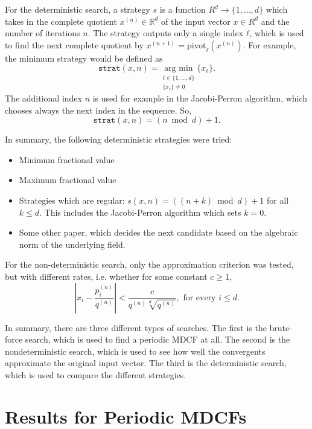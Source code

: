 For the deterministic search, a strategy $s$ is a function $R^d → \{1, …, d\}$
which takes in the complete quotient $x^{(n)} ∈ ℝ^d$ of the input vector $x ∈ R^d$
and the number of iterations $n$.
The strategy outputs only a single index $ℓ$,
which is used to find the next complete quotient by $x^{(n+1)} =
\mathrm{pivot}_ℓ(x^{(n)})$.
For example, the minimum strategy would be defined as
\[
  \texttt{strat}(x, n) = \underset{\substack{ℓ ∈ \{1, …, d\} \\ \{x_ℓ\} ≠ 0}}{\text{arg min}} \{x_ℓ\}.
\]
The additional index $n$ is used for example in the Jacobi-Perron algorithm,
which chooses always the next index in the sequence.
So,
\[
  \texttt{strat}(x, n) = (n \bmod d) + 1.
\]

In summary, the following deterministic strategies were tried:
\begin{itemize}
  \item Minimum fractional value
  \item Maximum fractional value
  \item Strategies which are regular: $s(x, n) = ((n + k) \bmod d) + 1$ for all $k ≤ d$.
    This includes the Jacobi-Perron algorithm which sets $k = 0$.
  \item Some other paper, which decides the next candidate
    based on the algebraic norm of the underlying field. %
\end{itemize}

For the non-deterministic search, only the approximation criterion was tested,
but with different rates, i.e. whether for some constant $c ≥ 1$,
\[
  \left|x_i - \frac{p_i^{(n)}}{q^{(n)}}\right| < \frac{c}{q^{(n)} \sqrt[d]{q^{(n)}}}, \text{ for every } i ≤ d.
\]

In summary,
there are three different types of searches.
The first is the brute-force search, which is used to find a periodic MDCF at all.
The second is the nondeterministic search, which is used to see how well the
convergents approximate the original input vector.
The third is the deterministic search, which is used to compare the different
strategies.

\section{Results for Periodic MDCFs}

